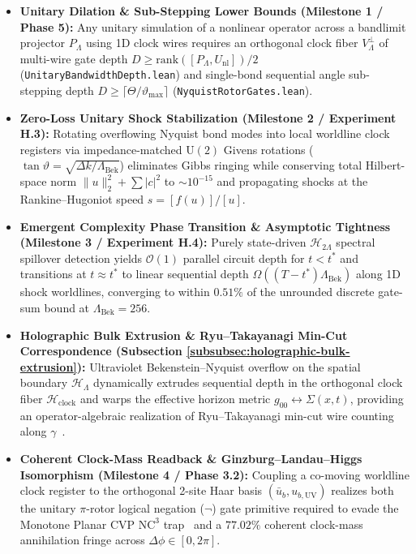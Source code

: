 \documentclass[11pt,a4paper]{article}
\theoremstyle{definition}
\begin{document}
\begin{itemize}
\item \textbf{Unitary Dilation \& Sub-Stepping Lower Bounds (Milestone 1 / Phase 5):} Any unitary simulation of a nonlinear operator across a bandlimit projector $P_{\Lambda}$ using 1D clock wires requires an orthogonal clock fiber $V_{\Lambda}^{\perp}$ of multi-wire gate depth $D \ge \mathrm{rank}([P_{\Lambda}, U_{\text{nl}}]) / 2$ (\texttt{Unitary\allowbreak{}Bandwidth\allowbreak{}Depth.lean}) and single-bond sequential angle sub-stepping depth $D \ge \lceil \Theta / \vartheta_{\max} \rceil$ (\texttt{Nyquist\allowbreak{}Rotor\allowbreak{}Gates.lean}).
\item \textbf{Zero-Loss Unitary Shock Stabilization (Milestone 2 / Experiment H.3):} Rotating overflowing Nyquist bond modes into local worldline clock registers via impedance-matched $\mathrm{U}(2)$ Givens rotations ($\tan\vartheta = \sqrt{\Delta k / \Lambda_{\text{Bek}}}$) eliminates Gibbs ringing while conserving total Hilbert-space norm $\|u\|_2^2 + \sum |c|^2$ to $\sim 10^{-15}$ and propagating shocks at the Rankine--Hugoniot speed $s = [f(u)]/[u]$.
\item \textbf{Emergent Complexity Phase Transition \& Asymptotic Tightness (Milestone 3 / Experiment H.4):} Purely state-driven $\mathcal{H}_{2\Lambda}$ spectral spillover detection yields $\mathcal{O}(1)$ parallel circuit depth for $t < t^*$ and transitions at $t \approx t^*$ to linear sequential depth $\Omega((T - t^*) \Lambda_{\text{Bek}})$ along 1D shock worldlines, converging to within $0.51\%$ of the unrounded discrete gate-sum bound at $\Lambda_{\text{Bek}} = 256$.
\item \textbf{Holographic Bulk Extrusion \& Ryu--Takayanagi Min-Cut Correspondence (Subsection \ref{subsubsec:holographic-bulk-extrusion}):} Ultraviolet Bekenstein--Nyquist overflow on the spatial boundary $\mathcal{H}_{\Lambda}$ dynamically extrudes sequential depth in the orthogonal clock fiber $\mathcal{H}_{\text{clock}}$ and warps the effective horizon metric $g_{00} \leftrightarrow \Sigma(x,t)$, providing an operator-algebraic realization of Ryu--Takayanagi min-cut wire counting along $\gamma$~\cite{ryutakayanagi2006,swingle2012}.
\item \textbf{Coherent Clock-Mass Readback \& Ginzburg--Landau--Higgs Isomorphism (Milestone 4 / Phase 3.2):} Coupling a co-moving worldline clock register to the orthogonal 2-site Haar basis $(\bar{u}_b, u_{b,\text{UV}})$ realizes both the unitary $\pi$-rotor logical negation ($\neg$) gate primitive required to evade the Monotone Planar CVP $\mathrm{NC}^3$ trap~\cite{limaye2009} and a $77.02\%$ coherent clock-mass annihilation fringe across $\Delta\phi \in [0, 2\pi]$.
\end{itemize}
\end{document}
